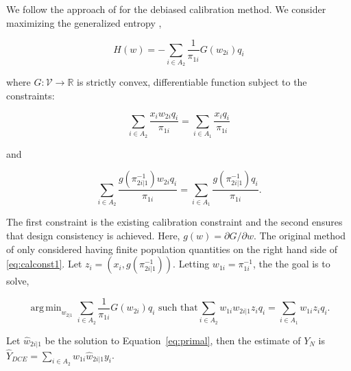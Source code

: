 \documentclass[12pt]{article}
\DeclareMathOperator*{\argmin}{arg\,min}
\newcommand{\R}{\mathbb{R}}
\begin{document}


We follow the approach of \cite{kwon2024debiased} for the debiased calibration
method. We consider maximizing the generalized entropy \cite{gneiting2007strictly},

\begin{equation}\label{eq:primalloss}
  H(w) = - \sum_{i \in A_2} \frac{1}{\pi_{1i}} G(w_{2i}) q_i
\end{equation}

where $G: \mathcal{V} \to \R$ is strictly convex, differentiable function
subject to the constraints:

\begin{equation}\label{eq:calconst1}
  \sum_{i \in A_2} \frac{x_i w_{2i}q_i}{\pi_{1i}} = 
\sum_{i \in A_1} \frac{x_iq_i}{\pi_{1i}}
\end{equation}

and 

\begin{equation}\label{eq:calconst2}
  \sum_{i \in A_2} \frac{g(\pi_{2i|1}^{-1})w_{2i}q_i}{\pi_{1i}} = 
  \sum_{i \in A_1} \frac{g(\pi_{2i|1}^{-1})q_i}{\pi_{1i}}.
\end{equation}

The first constraint is the existing calibration constraint and the second
ensures that design consistency is achieved. Here, 
$g(w) = \partial G / \partial w$. 
The original method of \cite{kwon2024debiased} only considered having finite
population quantities on the right hand side of \ref{eq:calconst1}.
Let $z_i = (x_i, g(\pi_{2i|1}^{-1}))$. Letting $w_{1i} = \pi_{1i}^{-1}$,
the the goal is to solve,

\begin{equation}\label{eq:primal}
  \argmin_{w_{2|1}} \sum_{i \in A_2} \frac{1}{\pi_{1i}} G(w_{2i}) q_i 
  \text{ such that}
  \sum_{i \in A_2} w_{1i} w_{2i|1} z_i q_i = \sum_{i \in A_1} w_{1i} z_i
  q_i.
\end{equation}

Let $\hat w_{2i|1}$ be the solution to Equation~\ref{eq:primal}, then the
estimate of $Y_N$ is $\hat Y_{DCE} = \sum_{i \in A_2} w_{1i} \hat w_{2i|1} y_i$.
\end{document}
